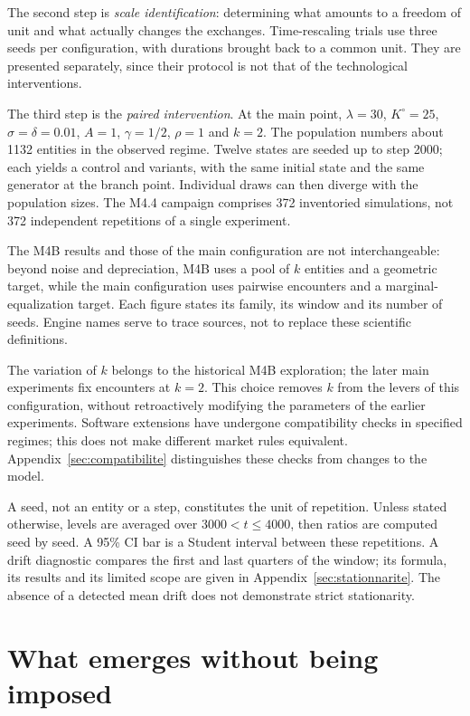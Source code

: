The second step is \emph{scale identification}: determining what
amounts to a freedom of unit and what actually changes the exchanges.
Time-rescaling trials use three seeds per configuration, with durations
brought back to a common unit. They are presented separately, since
their protocol is not that of the technological interventions.

The third step is the \emph{paired intervention}. At the main point,
$\lambda=30$, $K^\circ=25$, $\sigma=\delta=0.01$, $A=1$, $\gamma=1/2$,
$\rho=1$ and $k=2$. The population numbers about 1132 entities in the
observed regime. Twelve states are seeded up to step 2000; each yields
a control and variants, with the same initial state and the same
generator at the branch point. Individual draws can then diverge with
the population sizes. The M4.4 campaign comprises 372 inventoried
simulations, not 372 independent repetitions of a single experiment.

The M4B results and those of the main configuration are not
interchangeable: beyond noise and depreciation, M4B uses a pool of $k$
entities and a geometric target, while the main configuration uses
pairwise encounters and a marginal-equalization target. Each figure
states its family, its window and its number of seeds. Engine names
serve to trace sources, not to replace these scientific definitions.

The variation of $k$ belongs to the historical M4B exploration; the
later main experiments fix encounters at $k=2$. This choice removes $k$
from the levers of this configuration, without retroactively modifying
the parameters of the earlier experiments. Software extensions have
undergone compatibility checks in specified regimes; this does not make
different market rules equivalent. Appendix~\ref{sec:compatibilite}
distinguishes these checks from changes to the model.

A seed, not an entity or a step, constitutes the unit of repetition.
Unless stated otherwise, levels are averaged over $3000<t\le4000$, then
ratios are computed seed by seed. A 95\% CI bar is a Student interval
between these repetitions. A drift diagnostic compares the first and
last quarters of the window; its formula, its results and its limited
scope are given in Appendix~\ref{sec:stationnarite}. The absence of a
detected mean drift does not demonstrate strict stationarity.

\section{What emerges without being imposed}\label{sec:systeme}
